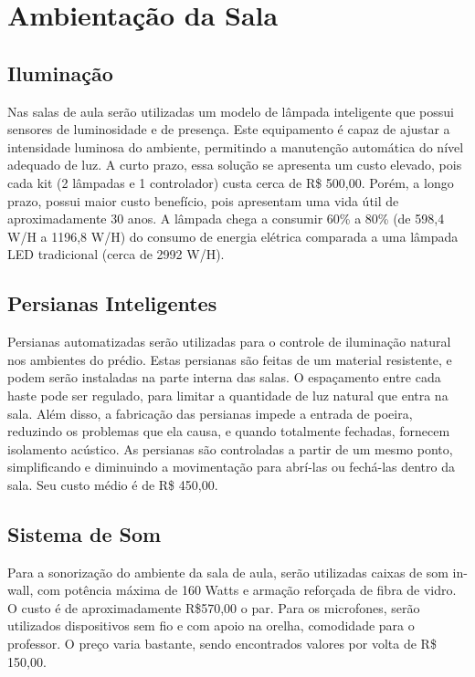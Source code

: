 \section{Ambientação da Sala}
\subsection{Iluminação}

Nas salas de aula serão utilizadas um modelo de lâmpada inteligente que possui sensores de luminosidade e de presença. Este equipamento é capaz de ajustar a intensidade luminosa do ambiente, permitindo a manutenção automática do nível adequado de luz. A curto prazo, essa solução se apresenta um custo elevado, pois cada kit (2 lâmpadas e 1 controlador) custa cerca de R\$ 500,00. Porém, a longo prazo, possui maior custo benefício, pois apresentam uma vida útil de aproximadamente 30 anos. A lâmpada chega a consumir 60\% a 80\% (de 598,4 W/H a  1196,8 W/H) do consumo de energia elétrica comparada a uma lâmpada LED tradicional (cerca de 2992 W/H).

\subsection{Persianas Inteligentes}

Persianas automatizadas serão utilizadas para o controle de iluminação natural nos ambientes do prédio. Estas persianas são feitas de um material resistente, e podem serão instaladas na parte interna das salas. O espaçamento entre cada haste pode ser regulado, para limitar a quantidade de luz natural que entra na sala. Além disso, a fabricação das persianas impede a entrada de poeira, reduzindo os problemas que ela causa, e quando totalmente fechadas, fornecem isolamento acústico.
As persianas são controladas a partir de um mesmo ponto, simplificando e diminuindo a movimentação para abrí-las ou fechá-las dentro da sala. Seu custo médio é de R\$ 450,00.

\subsection{Sistema de Som}

Para a sonorização do ambiente da sala de aula, serão utilizadas caixas de som in-wall, com potência máxima de 160 Watts e armação reforçada de fibra de vidro. O custo é de aproximadamente R\$570,00 o par.
Para os microfones, serão utilizados dispositivos sem fio e com apoio na orelha, comodidade para o professor. O preço varia bastante, sendo encontrados valores por volta de R\$ 150,00.

